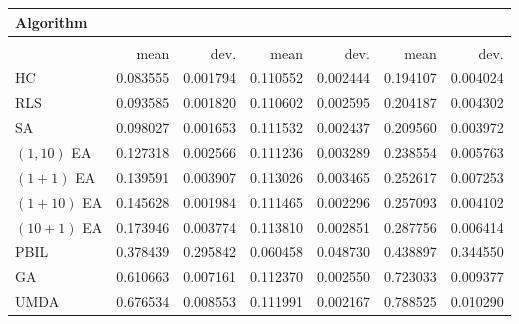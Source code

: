 \begin{tabular}{@{} l *{6}{>{{}}N{1}{2}} @{}}
\toprule
{Algorithm} &  \\
\midrule
&  &  &  \\
\midrule
& {mean} & {dev.} & {mean} & {dev.} & {mean} & {dev.} \\
\midrule
HC & 0.083555 & 0.001794 & 0.110552 & 0.002444 & 0.194107 & 0.004024 \\
RLS & 0.093585 & 0.001820 & 0.110602 & 0.002595 & 0.204187 & 0.004302 \\
SA & 0.098027 & 0.001653 & 0.111532 & 0.002437 & 0.209560 & 0.003972 \\
$(1,10)$ EA & 0.127318 & 0.002566 & 0.111236 & 0.003289 & 0.238554 & 0.005763 \\
$(1+1)$ EA & 0.139591 & 0.003907 & 0.113026 & 0.003465 & 0.252617 & 0.007253 \\
$(1+10)$ EA & 0.145628 & 0.001984 & 0.111465 & 0.002296 & 0.257093 & 0.004102 \\
$(10+1)$ EA & 0.173946 & 0.003774 & 0.113810 & 0.002851 & 0.287756 & 0.006414 \\
PBIL & 0.378439 & 0.295842 & 0.060458 & 0.048730 & 0.438897 & 0.344550 \\
GA & 0.610663 & 0.007161 & 0.112370 & 0.002550 & 0.723033 & 0.009377 \\
UMDA & 0.676534 & 0.008553 & 0.111991 & 0.002167 & 0.788525 & 0.010290 \\
\bottomrule
\end{tabular}
